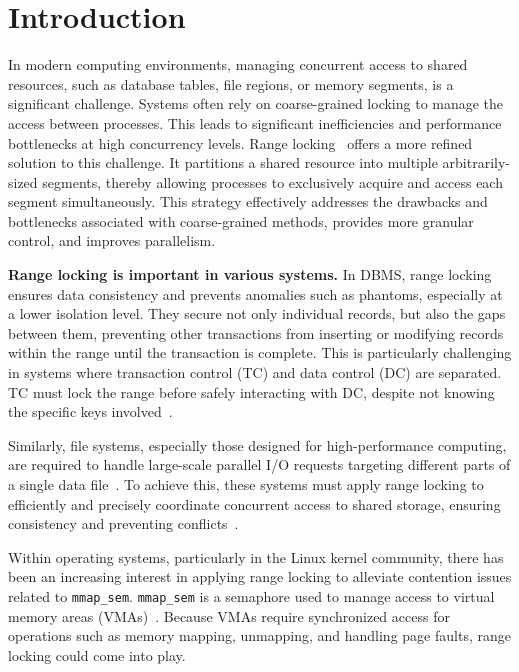\chapter{Introduction}\label{chapter:introduction}

In modern computing environments, managing concurrent access to shared resources, such as database tables, file regions, or memory segments, is a significant challenge.
Systems often rely on coarse-grained locking to manage the access between processes. 
This leads to significant inefficiencies and performance bottlenecks at high concurrency levels. 
Range locking~\parencite{gao2023citron, kogan2020scalable, song2013parallelizing} offers a more refined solution to this challenge. 
It partitions a shared resource into multiple arbitrarily-sized segments, thereby allowing processes to exclusively acquire and access each segment simultaneously.
This strategy effectively addresses the drawbacks and bottlenecks associated with coarse-grained methods, provides more granular control, and improves parallelism.

\textbf{Range locking is important in various systems.}
In DBMS, range locking ensures data consistency and prevents anomalies such as phantoms, especially at a lower isolation level. 
They secure not only individual records, but also the gaps between them, preventing other transactions from inserting or modifying records within the range until the transaction is complete. 
This is particularly challenging in systems where transaction control (TC) and data control (DC) are separated. 
TC must lock the range before safely interacting with DC, despite not knowing the specific keys involved~\parencite{lomet2009locking}.

Similarly, file systems, especially those designed for high-performance computing, are required to handle large-scale parallel I/O requests targeting different parts of a single data file~\parencite{congiu2016improving, kang2021optimizing}. 
To achieve this, these systems must apply range locking to efficiently and precisely coordinate concurrent access to shared storage, ensuring consistency and preventing conflicts~\parencite{gao2023citron, kim2019pnova, kogan2020scalable}.

Within operating systems, particularly in the Linux kernel community, there has been an increasing interest in applying range locking to alleviate contention issues related to \texttt{mmap\_sem}. 
\texttt{mmap\_sem} is a semaphore used to manage access to virtual memory areas (VMAs)~\parencite{readerWriterLocks2017, mapleTree2021, mmapLock2022}. 
Because VMAs require synchronized access for operations such as memory mapping, unmapping, and handling page faults, range locking could come into play.

